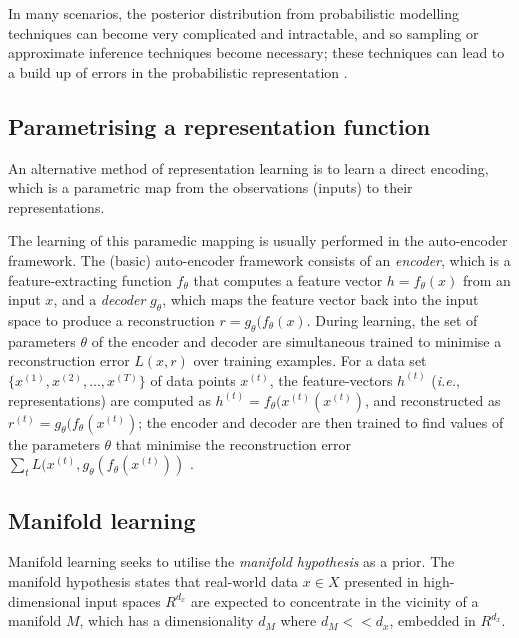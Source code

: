In many scenarios, the posterior distribution from probabilistic modelling techniques can become very complicated and intractable, and so sampling or approximate inference techniques become necessary; these techniques can lead to a build up of errors in the probabilistic representation \autocite{Bengio2013}.

\subsection{Parametrising a representation function}

An alternative method of representation learning is to learn a direct encoding, which is a parametric map from the observations (inputs) to their representations.

The learning of this paramedic mapping is usually performed in the auto-encoder framework.
The (basic) auto-encoder framework consists of an \textit{encoder}, which is a feature-extracting function $f_{\theta}$ that computes a feature vector $h=f_{\theta}(x)$ from an input $x$, and a \textit{decoder} $g_{\theta}$, which maps the feature vector back into the input space to produce a reconstruction $r=g_{\theta}(f_{\theta}(x)$.
During learning, the set of parameters $\theta$ of the encoder and decoder are simultaneous trained to minimise a reconstruction error $L(x,r)$ over training examples.
For a data set $\{x^{(1)}, x^{(2)}, ..., x^{(T)}\}$ of data points $x^{(t)}$, the feature-vectors $h^{(t)}$ (\textit{i.e.}, representations) are computed as $h^{(t)} = f_{\theta}(x^{(t)}(x^{(t)})$, and reconstructed as $r^{(t)}=g_{\theta}(f_{\theta}(x^{(t)})$; the encoder and decoder are then trained to find values of the parameters $\theta$ that minimise the reconstruction error $\sum_{t} L(x^{(t)}, g_{\theta}(f_{\theta}(x^{(t)}))$ \autocite{Bengio2013}.

\subsection{Manifold learning}\label{sec:manifold-learning}

Manifold learning seeks to utilise the \textit{manifold hypothesis} as a prior.
The manifold hypothesis states that real-world data $x \in X$ presented in high-dimensional input spaces $R^{d_{x}}$ are expected to concentrate in the vicinity of a manifold $M$, which has a dimensionality $d_{M}$ where $d_{M} << d_{x}$, embedded in $R^{d_{x}}$.

